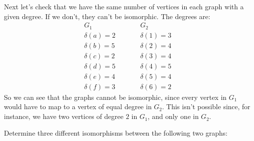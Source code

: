 \documentclass[a4paper, 12pt]{exam}
\begin{document}
\begin{questions}
\begin{solution}
    Next let's check that we have the same number of vertices in each graph with a given degree.
    If we don't, they can't be isomorphic.
    The degrees are:
    \begin{align*}
      &G_1& \qquad &G_2& \\
      &\delta(a) = 2& &\delta(1) = 3& \\
      &\delta(b) = 5& &\delta(2) = 4& \\
      &\delta(c) = 2& &\delta(3) = 4& \\
      &\delta(d) = 5& &\delta(4) = 5& \\
      &\delta(e) = 4& &\delta(5) = 4& \\
      &\delta(f) = 3& &\delta(6) = 2&
    \end{align*}
    So we can see that the graphs cannot be isomorphic, since every vertex in $G_1$ would have to map to a vertex of equal degree in $G_2$.
    This isn't possible since, for instance, we have two vertices of degree $2$ in $G_1$, and only one in $G_2$.
  \end{solution}

\question
  Determine three different isomorphisms between the following two graphs:
  \begin{center}
    \hspace{1.5cm}
  \end{center}


\end{questions}
\end{document}
